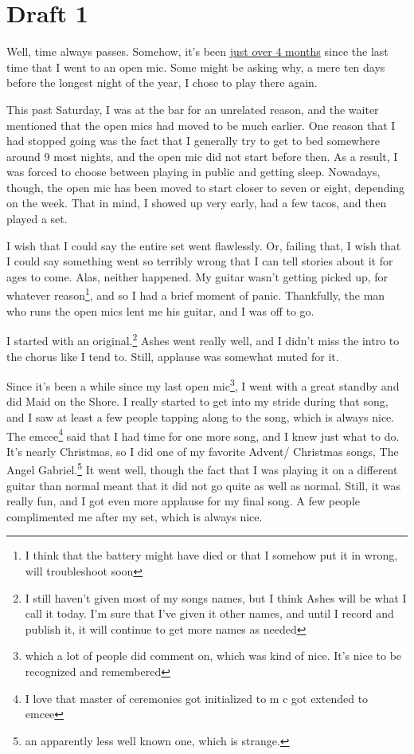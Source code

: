 \documentclass[12pt]{article}[titlepage]
\newcommand{\1}{\={a}}
\newcommand{\2}{\={e}}
\newcommand{\3}{\={\i}}
\newcommand{\4}{\=o}
\newcommand{\5}{\=u}
\newcommand{\6}{\={A}}
\renewcommand{\,}{\textsuperscript{,}}
\begin{document}
\section{Draft 1}
Well, time always passes.
Somehow, it's been \href{open-mic-8.html}{just over 4 months} since the last time that I went to an open mic.
Some might be asking why, a mere ten days before the longest night of the year, I chose to play there again.

This past Saturday, I was at the bar for an unrelated reason, and the waiter mentioned that the open mics had moved to be much earlier.
One reason that I had stopped going was the fact that I generally try to get to bed somewhere around 9 most nights, and the open mic did not start before then.
As a result, I was forced to choose between playing in public and getting sleep.
Nowadays, though, the open mic has been moved to start closer to seven or eight, depending on the week.
That in mind, I showed up very early, had a few tacos, and then played a set.

I wish that I could say the entire set went flawlessly.
Or, failing that, I wish that I could say something went so terribly wrong that I can tell stories about it for ages to come.
Alas, neither happened.
My guitar wasn't getting picked up, for whatever reason\footnote{I think that the battery might have died or that I somehow put it in wrong, will troubleshoot soon}, and so I had a brief moment of panic.
Thankfully, the man who runs the open mics lent me his guitar, and I was off to go.

I started with an original.\footnote{I still haven't given most of my songs names, but I think Ashes will be what I call it today. I'm sure that I've given it other names, and until I record and publish it, it will continue to get more names as needed}
Ashes went really well, and I didn't miss the intro to the chorus like I tend to.
Still, applause was somewhat muted for it.

Since it's been a while since my last open mic\footnote{which a lot of people did comment on, which was kind of nice. It's nice to be recognized and remembered}, I went with a great standby and did Maid on the Shore.
I really started to get into my stride during that song, and I saw at least a few people tapping along to the song, which is always nice.
The emcee\footnote{I love that master of ceremonies got initialized to m c got extended to emcee} said that I had time for one more song, and I knew just what to do.
It's nearly Christmas, so I did one of my favorite Advent/ Christmas songs, The Angel Gabriel.\footnote{an apparently less well known one, which is strange.}
It went well, though the fact that I was playing it on a different guitar than normal meant that it did not go quite as well as normal.
Still, it was really fun, and I got even more applause for my final song.
A few people complimented me after my set, which is always nice.
\end{document}
